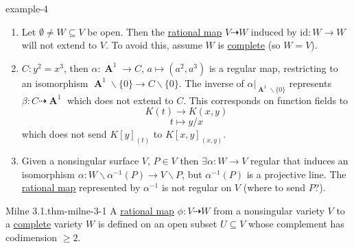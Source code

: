 \documentclass[10pt,]{book}
\numberwithin{equation}{section}
\newcommand{\id}{\mathrm{id}}
\DeclareMathOperator{\aff}{\mathbf{A}}
\begin{document}
\begin{example}{}{example-4}%
\hypertarget{p-86}{}%
\leavevmode%
\begin{enumerate}
\item\hypertarget{li-18}{}Let \(\emptyset \ne W \subseteq V\) be open. Then the \hyperref[def-rational-map]{rational map} \(V\dashrightarrow W\) induced by \(\id \colon W \to W\) will not extend to \(V\). To avoid this, assume \(W \) is \hyperref[def-abelian-complete-var]{complete} (so \(W = V\)).%
\item\hypertarget{li-19}{}\(C \colon y^2 = x^3\), then \(\alpha\colon \aff^1 \to C\), \(a\mapsto (a^2,a^3)\) is a regular map, restricting to an isomorphism  \(\aff^1 \smallsetminus \{0 \} \to C \smallsetminus \{0\}\). The inverse of \(\alpha|_{\aff^1\smallsetminus \{0\}}\) represents \(\beta \colon C \dashrightarrow \aff^1\) which does not extend to \(C\). This corresponds on function fields to%
\begin{equation*}
K(t) \to K(x,y)
\end{equation*}
%
\begin{equation*}
t\mapsto y/x
\end{equation*}
which does not send \(K[y]_{(t)}\) to \(K[x,y]_{(x,y)}\).%
\item\hypertarget{li-20}{}Given a nonsingular surface \(V,\, P\in V\) then \(\exists \alpha\colon W \to V\) regular that induces an isomorphism \(\alpha\colon W\smallsetminus \alpha^{-1} (P) \to V\smallsetminus P\), but \(\alpha^{-1}(P)\) is a projective line. The \hyperref[def-rational-map]{rational map} represented by \(\alpha^{-1}\) is not regular on \(V\) (where to send \(P\)?).%
\end{enumerate}
%
\end{example}
\begin{theorem}{Milne 3.1.}{}{thm-milne-3-1}%
\hypertarget{p-87}{}%
A \hyperref[def-rational-map]{rational map} \(\phi\colon V\dashrightarrow W\) from a nonsingular variety \(V\) to a \hyperref[def-abelian-complete-var]{complete} variety \(W\) is defined on an open subset  \(U \subseteq V\) whose complement has codimension \(\ge 2\).%
\end{theorem}
\end{document}
